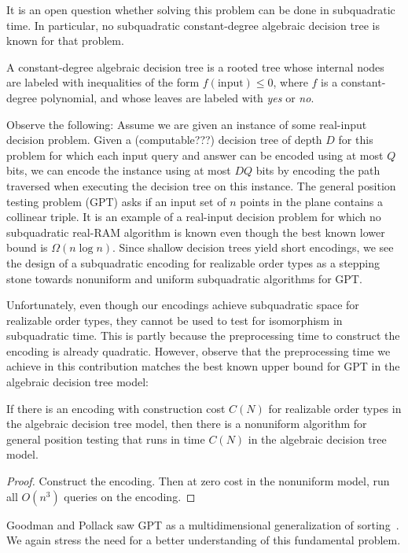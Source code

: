 It is an open question whether solving this problem can be done in subquadratic
time. In particular, no subquadratic constant-degree algebraic decision tree is
known for that problem.

A constant-degree algebraic decision tree is a rooted tree whose internal nodes are
labeled with inequalities of the form \(f(\text{input}) \leq 0\), where
\(f\) is a constant-degree polynomial,
and whose leaves are labeled with \emph{yes} or \emph{no}.

Observe the following: Assume we are given an instance of some real-input
decision problem. Given a (computable???) decision tree of depth \(D\) for this problem for which
each input query and answer can be encoded using at most \(Q\) bits, we can
encode the instance using at most \(DQ\) bits by encoding the path traversed when
executing the decision tree on this instance. The general position testing
problem (GPT) asks if an input set of \(n\) points in the plane contains a
collinear triple. It is an example of a real-input decision problem for which
no subquadratic real-RAM algorithm is known even though the best known lower
bound is \(\Omega(n \log n)\). Since shallow decision trees yield short encodings,
we see the design of a subquadratic encoding for realizable order types as a
stepping stone towards nonuniform and uniform subquadratic algorithms for
GPT\@.

Unfortunately, even though our encodings achieve subquadratic space for
realizable order types, they cannot be used to test for isomorphism in
subquadratic time. This is partly because the preprocessing time to construct
the encoding is already quadratic.
%
However, observe that the preprocessing time we achieve in this contribution
matches the best known upper bound for GPT in the algebraic decision tree
model:
\begin{theorem}
  If there is an encoding with construction cost \(C(N)\) for
  realizable order types in the algebraic decision tree model, then
  there is a nonuniform algorithm for general position testing that runs
  in time \(C(N)\) in the algebraic decision tree model.
\end{theorem}
%
\begin{proof}
  Construct the encoding. Then at zero cost in the nonuniform
  model, run all \(O(n^3)\) queries on the encoding.
\end{proof}
%
Goodman and Pollack saw GPT as a multidimensional generalization of
sorting~\cite{GP83}.
%
We again stress the need for a better understanding of this fundamental
problem.
